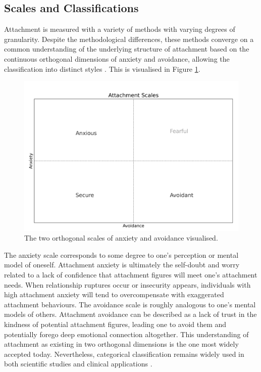 \documentclass[12pt]{report}
\begin{document}
\subsection*{Scales and Classifications}
Attachment is measured with a variety of methods with varying degrees of granularity.
Despite the methodological differences, these methods converge on a common understanding of the underlying structure of attachment based on the continuous orthogonal dimensions of anxiety and avoidance, allowing the classification into distinct styles .
This is visualised in Figure \ref{fig: attachment scales}.

\begin{figure}
    \includegraphics[width=\textwidth]{figures/attachment_scales.png}
    \caption{The two orthogonal scales of anxiety and avoidance visualised.}
    \label{fig: attachment scales}
\end{figure}

The anxiety scale corresponds to some degree to one's perception or mental model of oneself.
Attachment anxiety is ultimately the self-doubt and worry related to a lack of confidence that attachment figures will meet one's attachment needs.
When relationship ruptures occur or insecurity appears, individuals with high attachment anxiety will tend to overcompensate with exaggerated attachment behaviours.
The avoidance scale is roughly analogous to one's mental models of others.
Attachment avoidance can be described as a lack of trust in the kindness of potential attachment figures, leading one to avoid them and potentially forego deep emotional connection altogether.
This understanding of attachment as existing in two orthogonal dimensions is the one most widely accepted today.
Nevertheless, categorical classification remains widely used in both scientific studies and clinical applications \cite{Mikulincer2013,Mikulincer2007}.
\end{document}
